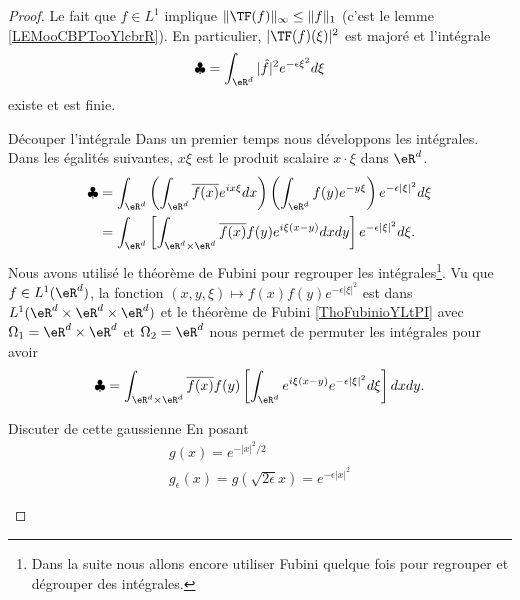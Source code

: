 \begin{proof}
    Le fait que \( f\in L^1\) implique \( \| \TF(f) \|_{\infty}\leq \| f \|_1\) (c'est le lemme \ref{LEMooCBPTooYlcbrR}). En particulier, \( | \TF(f)(\xi) |^2\) est majoré et l'intégrale
    \begin{equation}
        \clubsuit=\int_{\eR^d}| \hat f |^2 e^{-\epsilon\xi^2}d\xi
    \end{equation}
    existe et est finie. 
    \begin{subproof}
        \item[Découper l'intégrale]
    Dans un premier temps nous développons les intégrales. Dans les égalités suivantes, \( x\xi\) est le produit scalaire \( x\cdot \xi\) dans \( \eR^d\).
    \begin{subequations}
        \begin{align}
            \clubsuit&=\int_{\eR^d}\left( \int_{\eR^d} \overline{ f(x) } e^{ix\xi}dx \right)\left( \int_{\eR^d} f(y)  e^{-y\xi} \right) e^{- \epsilon | \xi |^2}d\xi\\
            &=\int_{\eR^d}\left[ \int_{\eR^d\times \eR^d}  \overline{ f(x) }  f(y) e^{i\xi(x-y)}dxdy \right] e^{-\epsilon| \xi |^2}d\xi.
        \end{align}
    \end{subequations}
    Nous avons utilisé le théorème de Fubini pour regrouper les intégrales\footnote{Dans la suite nous allons encore utiliser Fubini quelque fois pour regrouper et dégrouper des intégrales.}. Vu que \( f\in L^1(\eR^d)\), la fonction \( (x,y,\xi)\mapsto f(x)f(y) e^{-\epsilon| \xi |^2}\) est dans \( L^1(\eR^d\times \eR^d\times \eR^d)\) et le théorème de Fubini \ref{ThoFubinioYLtPI} avec \( \Omega_1=\eR^d\times \eR^d\) et \( \Omega_2=\eR^d\)  nous permet de permuter les intégrales pour avoir
    \begin{equation}        \label{EQooSUYWooCmtFeF}
        \clubsuit=\int_{\eR^d\times \eR^d} \overline{ f(x) }f(y)  \left[ \int_{\eR^d} e^{i\xi(x-y)} e^{-\epsilon| \xi |^2}d\xi \right]dxdy.
    \end{equation}
    \item[Discuter de cette gaussienne]
        En posant
        \begin{subequations}
            \begin{align}
                g(x)= e^{-| x |^2/2}\\
                g_{\epsilon}(x)=g(\sqrt{ 2\epsilon }x)= e^{-\epsilon| x |^2} 
            \end{align}
        \end{subequations} 

\end{subproof}
\end{proof}
